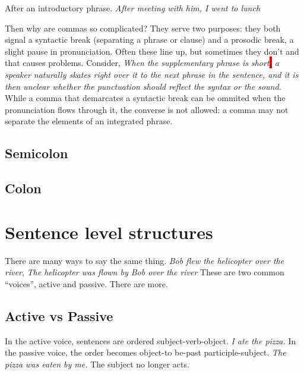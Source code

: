 \documentclass{article}
\newcommand{\hlq}[1]{\colorbox{red}{#1}}
\newcommand{\example}[1]{\textit{#1}}
\begin{document}
After an introductory phrase.
\example{After meeting with him, I went to lunch}



Then why are commas so complicated? They serve two purposes: they both signal a syntactic break (separating a phrase or clause) and a prosodic break, a slight pause in pronunciation.
Often these line up, but sometimes they don't and that causes problems. Consider,
\example{When the supplementary phrase is short\hlq{,} a speaker naturally skates right over it to the next phrase in the sentence, and it is then unclear whether the punctuation should reflect the syntax or the sound.}
While a comma that demarcates a syntactic break can be ommited when the pronunciation flows through it, the converse is not allowed: a comma may not separate the elements of an integrated phrase.

\subsection{Semicolon}

\subsection{Colon}


\section{Sentence level structures}

There are many ways to say the same thing.
\example{Bob flew the helicopter over the river},
\example{The helicopter was flown by Bob over the river}
These are two common ``voices'', active and passive. There are more.


\subsection{Active vs Passive}

In the active voice, sentences are ordered subject-verb-object.
\example{I ate the pizza.}
In the passive voice, the order becomes object-to be-past participle-subject.
\example{The pizza was eaten by me.}
The subject no longer acts.
\end{document}
